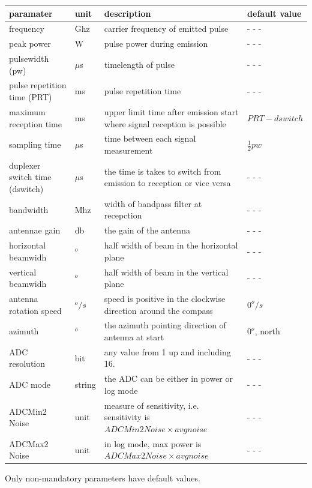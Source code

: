 \documentclass[letterpaper]{book}
\begin{document}
\begin{center}
\begin{tabular}{ p{5em} p{2em} p{12em} p{8em} } 
 paramater & unit & description & default value \\
 \hline
 frequency & Ghz & carrier frequency of emitted pulse &  - - - \\ 
 peak power & W & pulse power during emission & - - - \\
 pulsewidth (pw) & \(\mu\)s & timelength of pulse & - - - \\
 pulse repetition time (PRT) & ms & pulse repetition time &  - - - \\
 maximum reception time & ms & upper limit time after emission start where signal reception is possible & \(PRT - dswitch\) \\
 sampling time & \(\mu\)s & time between each signal measurement & \(\frac{1}{2}pw\) \\
 duplexer switch time (dswitch) & \(\mu\)s & the time is takes to switch from emission to reception or vice versa & - - - \\
 bandwidth & Mhz & width of bandpass filter at recepction &  - - - \\
 antennae gain & db & the gain of the antenna & - - - \\
 horizontal beamwidh & \(^{o}\) & half width of beam in the horizontal plane & - - - \\
 vertical beamwidh & \(^{o}\) & half width of beam in the vertical plane & - - - \\
 antenna rotation speed & \(^{o}/s\) & speed is positive in the clockwise direction around the compass & \(0^{o}/s\) \\
 azimuth & \(^{o}\) & the azimuth pointing direction of antenna at start & \(0^{o}\), north \\
 ADC resolution & bit & any value from 1 up and including 16. & - - -\\
 ADC mode & string & the ADC can be either in power or log mode & - - -\\
 ADCMin2 Noise & unit & measure of sensitivity, i.e. sensitivity is \(ADCMin2Noise \times avgnoise\) & - - -\\
 ADCMax2 Noise & unit & in log mode, max power is \(ADCMax2Noise \times avgnoise\) & - - -\\
\end{tabular}
\end{center}
Only non-mandatory parameters have default values. 
\end{document}
